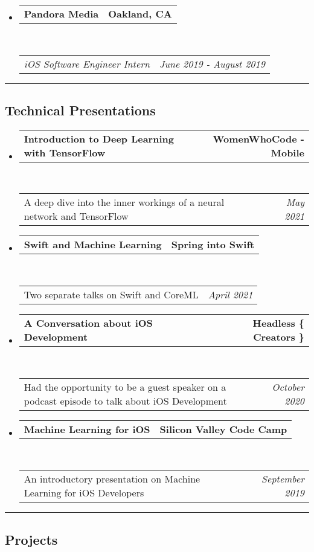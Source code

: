\documentclass[9pt,letterpaper]{article}
\makeatletter
\newcommand{\headerrow}[2]
{\begin{tabular*}{\linewidth}{l@{\extracolsep{\fill}}r}
	#1 &
	#2 \\
\end{tabular*}}
\makeatother
\begin{document}
\begin{itemize}
	\item
	\headerrow
		{\textbf{Pandora Media}}
		{\textbf{Oakland, CA}}
	\\
	\headerrow
		{\emph{iOS Software Engineer Intern}}
		{\emph{June 2019 - August 2019}}
\end{itemize}


\hrule
\vspace{-0.4em}
\subsection*{Technical Presentations}

\begin{itemize}
	\parskip=0.1em
	\item
	\headerrow
		{\textbf{Introduction to Deep Learning with TensorFlow}}
		{\textbf{WomenWhoCode - Mobile}}
	\\
	\headerrow
		{A deep dive into the inner workings of a neural network and TensorFlow}
		{\emph{May 2021}}
	\item
	\headerrow
		{\textbf{Swift and Machine Learning}}
		{\textbf{Spring into Swift}}
	\\
	\headerrow
		{Two separate talks on Swift and CoreML}
		{\emph{April 2021}}
	\item
	\headerrow
		{\textbf{A Conversation about iOS Development}}
		{\textbf{Headless \{ Creators \}}}
	\\
	\headerrow
		{Had the opportunity to be a guest speaker on a podcast episode to talk about iOS Development}
		{\emph{October 2020}}
	\item
	\headerrow
		{\textbf{Machine Learning for iOS}}
		{\textbf{Silicon Valley Code Camp}}
	\\
	\headerrow
		{An introductory presentation on Machine Learning for iOS Developers}
		{\emph{September 2019}}
\end{itemize}

\hrule
\vspace{-0.4em}
\subsection*{Projects}
\end{document}
